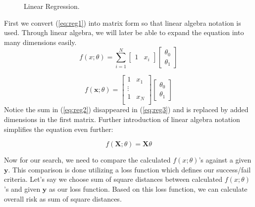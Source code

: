 \documentclass{ecctd01} %
\begin{document}
\begin{figure}[htpb]
  \vspace{3.0cm}  
  \caption{\label{linreg} Linear Regression.}
\end{figure}

First we convert (\ref{eq:reg1}) into matrix form so that linear
algebra notation is used. Through linear algebra, we will later be
able to expand the equation into many dimensions easily.
\begin{equation}
  \label{eq:reg2}
  f(x;\theta) = \sum_{i=1}^N 
  \left[ \begin{array}{cc}
      1 & x_{i}
  \end{array} \right]
  \left[ \begin{array}{c}
      \theta_{0} \\
      \theta_{1}
  \end{array} \right]
\end{equation}

 \begin{equation}
  \label{eq:reg3}
  f(\mathbf{x};\theta) = 
  \left[ \begin{array}{cc}
      1 & x_{1} \\
      \vdots \\
      1 & x_{N} \\      
  \end{array} \right]
  \left[ \begin{array}{c}
      \theta_{0} \\
      \theta_{1}
  \end{array} \right]
\end{equation}
Notice the sum in (\ref{eq:reg2}) disappeared in (\ref{eq:reg3}) and
is replaced by added dimensions in the first matrix. Further introduction
of linear algebra notation simplifies the equation even further: 

\begin{equation}
  \label{eq:reg4}
  f(\mathbf{X};\theta) = \mathbf{X}\theta
\end{equation}

Now for our search, we need to compare the calculated $f(x;\theta)$'s
against a given $\mathbf{y}$. This comparison is done utilizing a loss
function which defines our success/fail criteria. Let's say we choose
sum of square distances between calculated $f(x;\theta)$'s and given
$\mathbf{y}$ as our loss function. Based on this loss function, we can
calculate overall risk as sum of square distances.
\end{document}
